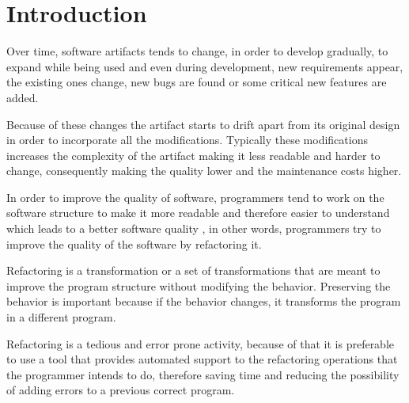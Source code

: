 
% 
% 

\section{Introduction}

Over time, software artifacts tends to change, in order to develop gradually, to expand %
while being used and even during development, new requirements appear, the existing ones change, new bugs are found or some critical %
new features are added.

Because of these changes the artifact starts to drift apart from its original design in order to incorporate all the modifications.
Typically these modifications increases the complexity of the artifact making it less readable and harder to change, consequently making the quality lower and the maintenance costs higher. %


In order to improve the quality of software, programmers tend to work on the software structure to make it more readable and therefore easier to understand which leads to a better software quality \cite{bourquin2007high}, in other words, programmers try to improve the quality of the software by refactoring it. %

Refactoring is a transformation or a set of transformations that are meant to improve the program structure without modifying the behavior. 
Preserving the behavior is important because if the behavior changes, it transforms the program in a different program.


Refactoring is a tedious and error prone activity, because of that it is preferable to use a tool that provides automated support to the refactoring operations that the programmer intends to do, therefore saving time and reducing the possibility of adding errors to a previous correct program.


